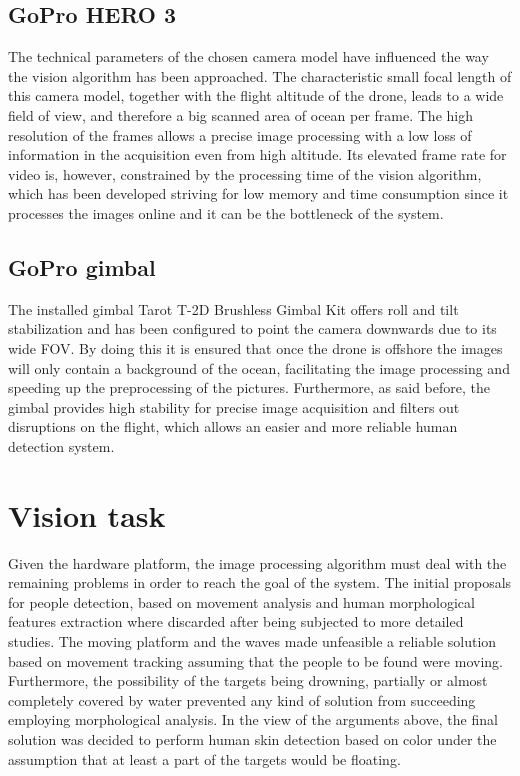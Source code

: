 \subsection{GoPro HERO 3}
The technical parameters of the chosen camera model have influenced the way
the vision algorithm has been approached.
The characteristic small focal length of this camera model, together with the flight altitude of the drone,
leads to a wide field of view, and therefore a big scanned area of ocean per frame. 
The high resolution of the frames allows a precise image processing with a low loss of information in
the acquisition even from high altitude.
Its elevated frame rate for video is, however, constrained by the processing time of the vision algorithm,
which has been developed striving for low memory and time consumption since
it processes the images online and it can be the bottleneck of the system.

\subsection{GoPro gimbal}
The installed gimbal Tarot T-2D Brushless Gimbal Kit offers roll and tilt stabilization and has been
configured to point the camera downwards due to its wide FOV. 
By doing this it is ensured that once the drone is offshore the images will only contain a background of the ocean,
facilitating the image processing and speeding up the preprocessing of the pictures.
Furthermore, as said before, the gimbal provides high stability for precise image acquisition and filters
out disruptions on the flight, which allows an easier and more reliable human detection system.


\section{Vision task}
Given the hardware platform, the image processing algorithm must deal with the remaining
problems in order to reach the goal of the system. 
The initial proposals for people detection, based on movement analysis and human morphological
features extraction where discarded after being subjected to more detailed studies. 
The moving platform and the waves made unfeasible a reliable solution based on movement
tracking assuming that the people to be found were moving.
Furthermore, the possibility of the targets being drowning, partially or almost completely
covered by water prevented any kind of solution from succeeding employing morphological analysis. 
In the view of the arguments above, the final solution was decided to perform human skin
detection based on color under the assumption that at least a part of the targets would be floating. 


